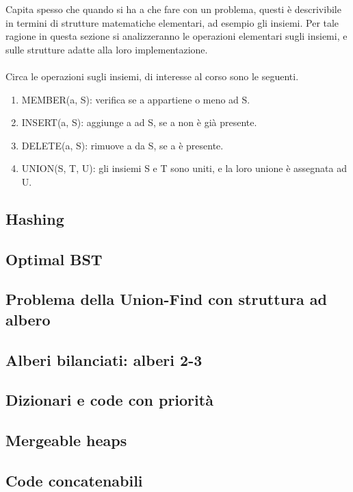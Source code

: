 \documentclass{subfiles}
\begin{document}
Capita spesso che quando si ha a che fare con un problema, questi è descrivibile in termini di strutture matematiche elementari, ad esempio gli insiemi.
Per tale ragione in questa sezione si analizzeranno le operazioni elementari sugli insiemi, e sulle strutture adatte alla loro implementazione.
\\ \\
Circa le operazioni sugli insiemi, di interesse al corso sono le seguenti.
\begin{enumerate}
    \item MEMBER(a, S): verifica se a appartiene o meno ad S.
    \item INSERT(a, S): aggiunge a ad S, se a non è già presente.
    \item DELETE(a, S): rimuove a da S, se a è presente.
    \item UNION(S, T, U): gli insiemi S e T sono uniti, e la loro unione è assegnata ad U.
\end{enumerate}

\subsection{Hashing}


\subsection{Optimal BST}

\clearpage

\subsection{Problema della Union-Find con struttura ad albero}

\clearpage

\subsection{Alberi bilanciati: alberi 2-3}

\clearpage

\subsection{Dizionari e code con priorità}

\clearpage

\subsection{Mergeable heaps}

\clearpage

\subsection{Code concatenabili}

\end{document}
